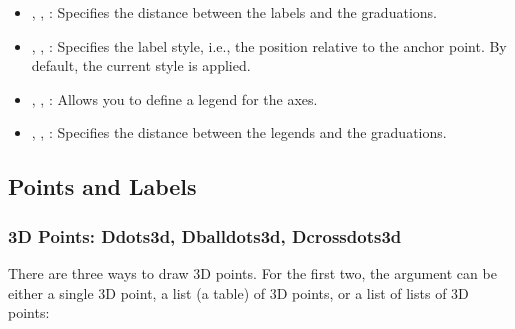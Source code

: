 \begin{itemize}
    \item {}, , : Specifies the distance between the labels and the graduations.

    \item {}, , : Specifies the label style, i.e., the position relative to the anchor point. By default, the current style is applied.

    \item {}, , : Allows you to define a legend for the axes.

    \item {}, , : Specifies the distance between the legends and the graduations.
\end{itemize}

\subsection{Points and Labels}

\subsubsection{3D Points: Ddots3d, Dballdots3d, Dcrossdots3d}

There are three ways to draw 3D points. For the first two, the argument  can be either a single 3D point, a list (a table) of 3D points, or a list of lists of 3D points:

